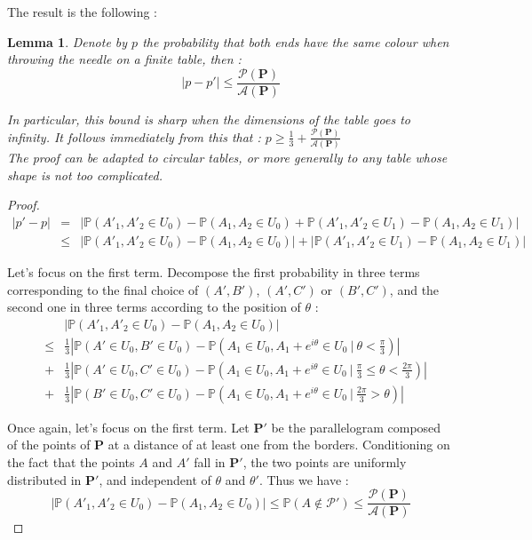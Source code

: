 \documentclass[a4paper,11pt]{article}
\newtheorem{lemma}{Lemma}
\theoremstyle{definition}
\theoremstyle{remark}
\begin{document}
The result is the following :
\begin{lemma}
Denote by $p$ the probability that both ends have the same colour when throwing 
the needle on a finite table, then :
 $$ | p - p'| \leq \frac{\mathcal{P}(\mathbf{P})}{\mathcal{A}(\mathbf{P})} $$

In particular, this bound is sharp when the dimensions of the table goes to 
infinity. It follows immediately from this that : $p \geq \frac13 + \frac{\mathcal{P}(\mathbf{P})}{\mathcal{A}(\mathbf{P})}$ \\
The proof can be adapted to circular tables, or more generally to any table 
whose shape is not too complicated. \\
\end{lemma}

\begin{proof}

\begin{eqnarray*}
|p' - p| 
  &=& | \mathbb{P}(A'_1 , A'_2 \in U_0) - \mathbb{P}(A_1 , A_2 \in U_0) + \mathbb{P}(A'_1 , A'_2 \in U_1) - \mathbb{P}(A_1 , A_2 \in U_1) | \\
  &\leq& | \mathbb{P}(A'_1 , A'_2 \in U_0) - \mathbb{P}(A_1 , A_2 \in U_0) | + | \mathbb{P}(A'_1 , A'_2 \in U_1) - \mathbb{P}(A_1 , A_2 \in U_1) | 
\end{eqnarray*}

Let's focus on the first term. 
Decompose the first probability in three terms corresponding to the final 
choice of $(A',B')$, $(A',C')$ or $(B',C')$, and the second one in three terms 
according to the position of $\theta$ :
\begin{eqnarray*}
& & \left| \mathbb{P}(A'_1 , A'_2 \in U_0) - \mathbb{P}(A_1 , A_2 \in U_0) \right| \\
&\leq& \frac{1}{3} \left| \mathbb{P}(A' \in U_0 , B' \in U_0) - \mathbb{P}(A_1 \in U_0 , A_1 + e^{i \theta} \in U_0 \ |\  \theta < \frac{\pi}{3} ) \right| \\
&+& \frac{1}{3} \left| \mathbb{P}(A' \in U_0 , C' \in U_0) - \mathbb{P}(A_1 \in U_0 , A_1 + e^{i \theta} \in U_0 \ |\  \frac{\pi}{3} \leq \theta < \frac{2 \pi}{3} ) \right| \\
&+& \frac{1}{3} \left| \mathbb{P}(B' \in U_0 ,C' \in U_0) - \mathbb{P}(A_1 \in U_0 , A_1 + e^{i \theta} \in U_0 \ | \  \frac{2 \pi}{3} > \theta ) \right|
\end{eqnarray*}

Once again, let's focus on the first term. Let $\mathbf{P'}$ be the 
parallelogram  composed of the points of  $\mathbf{P}$ at a distance of at 
least one from the borders. Conditioning on the fact that the points $A$ and 
$A'$ fall in $\mathbf{P'}$, the two points are uniformly distributed in 
$\mathbf{P'}$, and independent of $\theta$ and $\theta'$. Thus we have : 
$$ \left| \mathbb{P}(A'_1 , A'_2 \in U_0) - \mathbb{P}(A_1 , A_2 \in U_0) \right| \leq \mathbb P(A \not \in \mathcal{P'}) \leq \frac{\mathcal{P}(\mathbf{P})}{\mathcal{A}(\mathbf{P})} $$


\end{proof}
\end{document}
